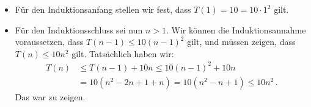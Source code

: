 \documentclass[a4paper,11pt,oneside]{scrartcl}
\begin{document}
\begin{itemize}
  \item Für den Induktionsanfang stellen wir fest, dass $T(1)=10=10 \cdot 1^2$ gilt.
  \item Für den Induktionsschluss sei nun $n>1$. Wir können die Induktionsannahme voraussetzen, dass $T(n-1)\le 10 (n-1)^2$ gilt, und müssen zeigen, dass $T(n)\le 10n^2$ gilt. Tatsächlich haben wir:
  \begin{align*}
    T(n) &\le T(n-1)+10n
    \le 10(n-1)^2 + 10n\\
    &= 10 (n^2-2n+1+n)
    = 10 (n^2-n+1) \le 10 n^2\,.
  \end{align*}
  Das war zu zeigen.
\end{itemize}



\end{document}
